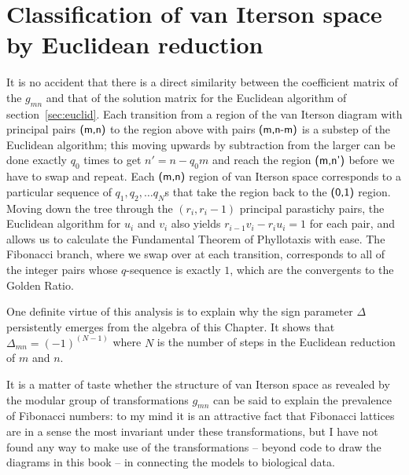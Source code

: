 	

\section{Classification of van Iterson space by Euclidean reduction}
It is no accident that there is a direct similarity between the coefficient matrix of the $g_{mn}$ and that of the solution matrix for the Euclidean algorithm of section~\ref{sec:euclid}.
Each transition from a region of the van Iterson diagram with principal pairs $\textsf{(m,n)}$ to the region above with pairs $\textsf{(m,n-m)}$ is a substep of the Euclidean algorithm; this moving upwards by subtraction from the larger can be done exactly $q_0$ times to get $n'=n-q_0 m$ and reach the region $\textsf{(m,n')}$ before we have to swap and repeat. 
Each $\textsf{(m,n)}$ region of van Iterson space corresponds to a particular sequence of  $q_1, q_2, \ldots q_N$s that take the region back to the $\textsf{(0,1)}$ region.     Moving down the tree through the $(r_i,r_i-1)$ principal parastichy pairs, the Euclidean algorithm for $u_i$ and $v_i$ also yields  $r_{i-1} v_i- r_i u_i=1$ for each pair, and allows us to calculate the Fundamental Theorem of Phyllotaxis with ease. The Fibonacci branch, where we swap over at each transition, corresponds to all of the integer pairs whose $q$-sequence is exactly $1$, which are the convergents to the Golden Ratio. 

One definite virtue of this analysis is to explain why the sign parameter $\Delta$ persistently emerges from the algebra of this Chapter. It shows that $\Delta_{mn}=(-1)^{(N-1)}$ where $N$ is the number of steps in the Euclidean reduction of $m$ and $n$. 

It is a matter of taste whether the structure of van Iterson space as revealed by the modular group of transformations $g_{mn}$ can be said to explain the prevalence of Fibonacci numbers: to my mind it is an attractive fact that Fibonacci lattices are in a sense the most invariant under these transformations, but I have not found any way to make use of the transformations -- beyond  code to draw the diagrams in this book -- in connecting the models to biological data. 



